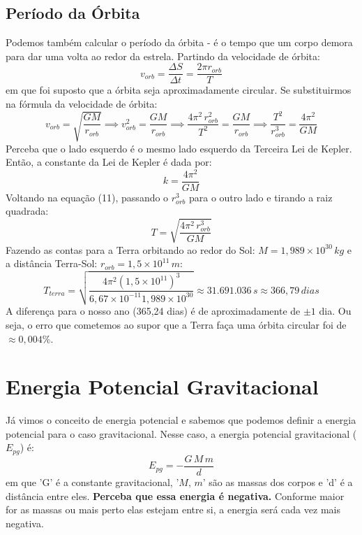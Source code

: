 \documentclass[12pt]{extarticle}
\newcommand{\<}{\langle}
\renewcommand{\>}{\rangle}
\theoremstyle{definition}
\begin{document}
\subsection{Período da Órbita}
Podemos também calcular o período da órbita - é o tempo que um corpo demora para dar uma volta ao redor da estrela. Partindo da velocidade de órbita:
\begin{equation}
    v_{orb} = \frac{\Delta S}{\Delta t} = \frac{2\pi r_{orb}}{T}
\end{equation}
\noindent em que foi suposto que a órbita seja aproximadamente circular. Se substituirmos na fórmula da velocidade de órbita:
\begin{equation}
    v_{orb} = \sqrt{\frac{GM}{r_{orb}}} \implies v_{orb}^2 = \frac{GM}{r_{orb}} \implies \frac{4\pi^2\,r_{orb}^2}{T^2} = \frac{GM}{r_{orb}} \implies \frac{T^2}{r_{orb}^3} = \frac{4\pi^2}{GM}
\end{equation}
Perceba que o lado esquerdo é o mesmo lado esquerdo da Terceira Lei de Kepler. Então, a constante da Lei de Kepler é dada por:
\begin{equation}
    k = \frac{4\pi^2}{GM}
\end{equation}
Voltando na equação (11), passando o $r_{orb}^3$ para o outro lado e tirando a raiz quadrada:
\begin{equation}
    T = \sqrt{\frac{4\pi^2\,r_{orb}^3}{GM}}
\end{equation}
Fazendo as contas para a Terra orbitando ao redor do Sol: $M=1,989\times10^{30}\,kg$ e a distância Terra-Sol: $r_{orb} = 1,5\times10^{11}\,m$:
\begin{equation}
    T_{terra} = \sqrt{\frac{4\pi^2(1,5\times10^{11})^3}{6,67\times10^{-11}1,989\times10^{30}}} \approx 31.691.036\,s \approx 366,79 \, dias
\end{equation}
A diferença para o nosso ano (365,24 dias) é de aproximadamente de $\pm 1$ dia. Ou seja, o erro que cometemos ao supor que a Terra faça uma órbita circular foi de $\approx 0,004\%$.

\section{Energia Potencial Gravitacional}
Já vimos o conceito de energia potencial e sabemos que podemos definir a energia potencial para o caso gravitacional. Nesse caso, a energia potencial gravitacional ($E_{pg}$) é:
\begin{equation}
    E_{pg} = - \frac{G\,M\,m}{d}
\end{equation}
\noindent em que 'G' é a constante gravitacional, '$M,\,m$' são as massas dos corpos e 'd' é a distância entre eles. \textbf{Perceba que essa energia é negativa.} Conforme maior for as massas ou mais perto elas estejam entre si, a energia será cada vez mais negativa. 
\end{document}
